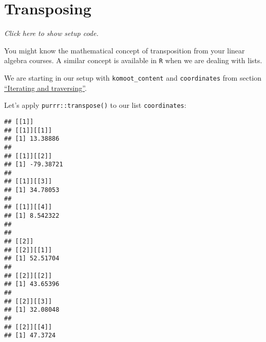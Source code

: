 \documentclass[]{book}
\newenvironment{Shaded}{\begin{snugshade}}{\end{snugshade}}
\newcommand{\DecValTok}[1]{\textcolor[rgb]{0.00,0.00,0.81}{#1}}
\newcommand{\KeywordTok}[1]{\textcolor[rgb]{0.13,0.29,0.53}{\textbf{#1}}}
\newcommand{\NormalTok}[1]{#1}
\newcommand{\OperatorTok}[1]{\textcolor[rgb]{0.81,0.36,0.00}{\textbf{#1}}}
\newcommand{\StringTok}[1]{\textcolor[rgb]{0.31,0.60,0.02}{#1}}
\begin{document}
\hypertarget{transpose}{%
\section{Transposing}\label{transpose}}

\emph{Click here to show setup code.}

\begin{Shaded}
\end{Shaded}

You might know the mathematical concept of transposition from your linear algebra courses.
A similar concept is available in \texttt{R} when we are dealing with lists.

We are starting in our setup with \texttt{komoot\_content} and \texttt{coordinates} from section \protect\hyperlink{komoot}{``Iterating and traversing''}.

Let's apply \texttt{purrr::transpose()} to our list \texttt{coordinates}:

\begin{Shaded}
\end{Shaded}

\begin{verbatim}
## [[1]]
## [[1]][[1]]
## [1] 13.38886
## 
## [[1]][[2]]
## [1] -79.38721
## 
## [[1]][[3]]
## [1] 34.78053
## 
## [[1]][[4]]
## [1] 8.542322
## 
## 
## [[2]]
## [[2]][[1]]
## [1] 52.51704
## 
## [[2]][[2]]
## [1] 43.65396
## 
## [[2]][[3]]
## [1] 32.08048
## 
## [[2]][[4]]
## [1] 47.3724
\end{verbatim}
\end{document}

